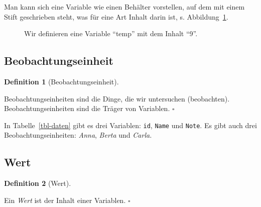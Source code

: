 \documentclass[
  letterpaper,
]{scrbook}
\theoremstyle{definition}
\theoremstyle{definition}
\theoremstyle{definition}
\newtheorem{definition}{Definition}[chapter]
\theoremstyle{remark}
\begin{document}
Man kann sich eine Variable wie einen Behälter vorstellen, auf dem mit
einem Stift geschrieben steht, was für eine Art Inhalt darin ist, s.
Abbildung~\ref{fig-var-zuweisen}.

\begin{figure}


\caption{\label{fig-var-zuweisen}Wir definieren eine Variable
\enquote{temp} mit dem Inhalt \enquote{9}.}

\end{figure}%

\subsection{Beobachtungseinheit}\label{beobachtungseinheit}

\begin{definition}[Beobachtungseinheit]\protect\hypertarget{def-beobeinheit}{}\label{def-beobeinheit}

Beobachtungseinheiten sind die Dinge, die wir untersuchen (beobachten).
Beobachtungseinheiten sind die Träger von Variablen. \(\square\)

\end{definition}

In Tabelle~\ref{tbl-daten} gibt es drei Variablen: \texttt{id},
\texttt{Name} und \texttt{Note}. Es gibt auch drei
Beobachtungseinheiten: \emph{Anna}, \emph{Berta} und \emph{Carla.}

\subsection{Wert}\label{wert}

\begin{definition}[Wert]\protect\hypertarget{def-wert}{}\label{def-wert}

Ein \emph{Wert} ist der Inhalt einer Variablen. \(\square\)

\end{definition}
\end{document}
